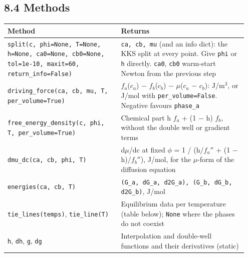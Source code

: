 \documentclass[12pt,a4paper]{article}
\begin{document}
\subsection*{8.4 Methods}
\begingroup\small
\begin{longtable}{>{\raggedright\arraybackslash}p{0.448\linewidth}>{\raggedright\arraybackslash}p{0.499\linewidth}}
\toprule
\textbf{Method} & \textbf{Returns} \\
\midrule
\endhead
\texttt{split(c,\allowbreak{} phi=None,\allowbreak{} T=None,\allowbreak{} h=None,\allowbreak{} ca0=None,\allowbreak{} cb0=None,\allowbreak{} tol=1e-{}10,\allowbreak{} maxit=60,\allowbreak{} return\_\allowbreak{}info=False)} & \texttt{ca,\allowbreak{} cb,\allowbreak{} mu} (and an info dict): the KKS split at every point. Give \texttt{phi} or \texttt{h} directly. \texttt{ca0}, \texttt{cb0} warm-start Newton from the previous step \\
\texttt{driving\_\allowbreak{}force(ca,\allowbreak{} cb,\allowbreak{} mu,\allowbreak{} T,\allowbreak{} per\_\allowbreak{}volume=True)} & \(f_{a}\)(\(c_{a}\)) \(-\) \(f_{b}\)(\(c_{b}\)) \(-\) \(\mu\)(\(c_{a}\) \(-\) \(c_{b}\)): J/m\(^{3}\), or J/mol with \texttt{per\_\allowbreak{}volume=False}. Negative favours \texttt{phase\_\allowbreak{}a} \\
\texttt{free\_\allowbreak{}energy\_\allowbreak{}density(c,\allowbreak{} phi,\allowbreak{} T,\allowbreak{} per\_\allowbreak{}volume=True)} & Chemical part h \(f_{a}\) + (1 \(-\) h) \(f_{b}\), without the double well or gradient terms \\
\texttt{dmu\_\allowbreak{}dc(ca,\allowbreak{} cb,\allowbreak{} phi,\allowbreak{} T)} & d\(\mu\)/dc at fixed \(\phi\) = 1 / (h/\(f_{a} ''\) + (1 \(-\) h)/\(f_{b} ''\)), J/mol, for the \(\mu\)-form of the diffusion equation \\
\texttt{energies(ca,\allowbreak{} cb,\allowbreak{} T)} & \texttt{(G\_\allowbreak{}a,\allowbreak{} dG\_\allowbreak{}a,\allowbreak{} d2G\_\allowbreak{}a),\allowbreak{} (G\_\allowbreak{}b,\allowbreak{} dG\_\allowbreak{}b,\allowbreak{} d2G\_\allowbreak{}b)}, J/mol \\
\texttt{tie\_\allowbreak{}lines(temps)}, \texttt{tie\_\allowbreak{}line(T)} & Equilibrium data per temperature (table below); \texttt{None} where the phases do not coexist \\
\texttt{h}, \texttt{dh}, \texttt{g}, \texttt{dg} & Interpolation and double-well functions and their derivatives (static) \\

\end{longtable}
\end{document}
